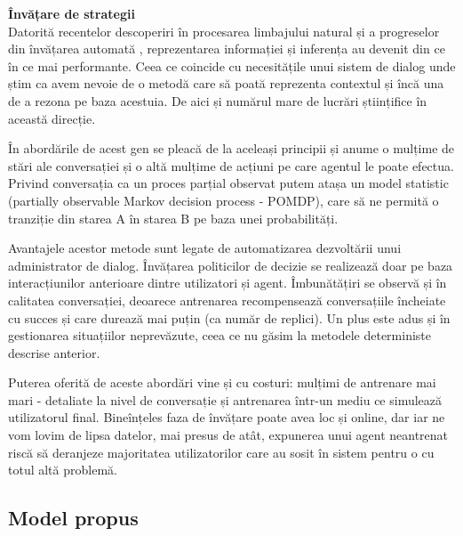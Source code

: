\textbf{Învățare de strategii}\\
Datorită recentelor descoperiri în procesarea limbajului natural \cite{mikolov2013} și a progreselor din învățarea automată \cite{adam2015}, reprezentarea informației și inferența au devenit din ce în ce mai performante. Ceea ce coincide cu necesitățile unui sistem de dialog unde știm ca avem nevoie de o metodă care să poată reprezenta contextul și încă una de a rezona pe baza acestuia. De aici și numărul mare de lucrări științifice în această direcție.

În abordările de acest gen se pleacă de la aceleași principii și anume o mulțime de stări ale conversației și o altă mulțime de acțiuni pe care agentul le poate efectua. Privind conversația ca un proces parțial observat putem atașa un model statistic (partially observable Markov decision process - POMDP), care să ne permită o tranziție din starea A în starea B pe baza unei probabilități.

Avantajele acestor metode sunt legate de automatizarea dezvoltării unui administrator de dialog. Învățarea politicilor de decizie se realizează doar pe baza interacțiunilor anterioare dintre utilizatori și agent. Îmbunătățiri se observă și în calitatea conversației, deoarece antrenarea recompensează conversațiile încheiate cu succes și care durează mai puțin (ca număr de replici). Un plus este adus și în gestionarea situațiilor neprevăzute, ceea ce nu găsim la metodele deterministe descrise anterior.

Puterea oferită de aceste abordări vine și cu costuri: mulțimi de antrenare mai mari - detaliate la nivel de conversație și antrenarea într-un mediu ce simulează utilizatorul final. Bineînțeles faza de învățare poate avea loc și online, dar iar ne vom lovim de lipsa datelor, mai presus de atât, expunerea unui agent neantrenat riscă să deranjeze majoritatea utilizatorilor care au sosit în sistem pentru o cu totul altă problemă.

\subsection{Model propus}

